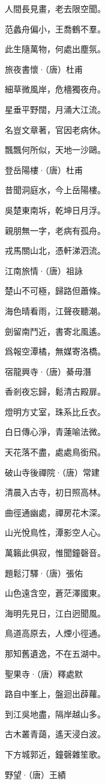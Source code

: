 \documentclass[12pt,a4paper]{ctexbook}
\begin{document}
人間長見畫，老去限空聞。\par
范蠡舟偏小，王喬鶴不羣。\par
此生隨萬物，何處出塵氛。\par
旅夜書懷·（唐）杜甫\par
細草微風岸，危檣獨夜舟。\par
星垂平野闊，月涌大江流。\par
名豈文章著，官因老病休。\par
飄飄何所似，天地一沙鷗。\par
登岳陽樓·（唐）杜甫\par
昔聞洞庭水，今上岳陽樓。\par
吳楚東南坼，乾坤日月浮。\par
親朋無一字，老病有孤舟。\par
戎馬關山北，憑軒涕泗流。\par
江南旅情·（唐）祖詠\par
楚山不可極，歸路但蕭條。\par
海色晴看雨，江聲夜聽潮。\par
劍留南鬥近，書寄北風遙。\par
爲報空潭橘，無媒寄洛橋。\par
宿龍興寺·（唐）綦毋潛\par
香剎夜忘歸，鬆清古殿扉。\par
燈明方丈室，珠系比丘衣。\par
白日傳心淨，青蓮喻法微。\par
天花落不盡，處處鳥銜飛。\par
破山寺後禪院·（唐）常建\par
清晨入古寺，初日照高林。\par
曲徑通幽處，禪房花木深。\par
山光悅鳥性，潭影空人心。\par
萬籟此俱寂，惟聞鐘磬音。\par
題鬆汀驛·（唐）張佑\par
山色遠含空，蒼茫澤國東。\par
海明先見日，江白迥聞風。\par
鳥道高原去，人煙小徑通。\par
那知舊遺逸，不在五湖中。\par
聖果寺·（唐）釋處默\par
路自中峯上，盤迴出薜蘿。\par
到江吳地盡，隔岸越山多。\par
古木叢青藹，遙天浸白波。\par
下方城郭近，鐘磬雜笙歌。\par
野望·（唐）王績\par
\end{document}
